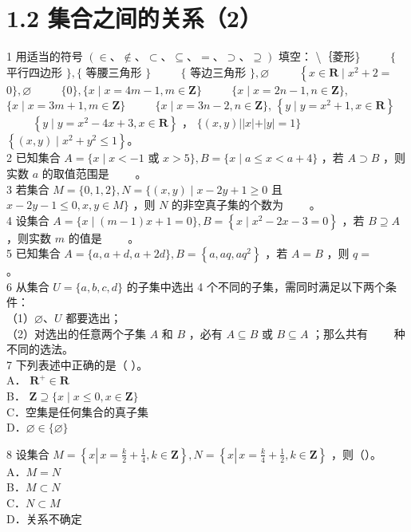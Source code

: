 \documentclass[10pt]{article}
\begin{document}
\section*{1.2 集合之间的关系（2）}
1 用适当的符号 \((\in 、 \notin 、 \subset 、 \subseteq 、=、 \supset 、 \supseteq)\) 填空： \textbackslash ｛菱形\} \(\qquad\) \(\{\) 平行四边形 \(\},\{\) 等腰三角形 \(\}\) \(\qquad\) \(\{\) 等边三角形 \(\}, \varnothing\) \(\qquad\) \(\left\{x \in \mathbf{R} \mid x^{2}+2=\right.\) \(0\}, \varnothing\) \(\qquad\) \(\{0\},\{x \mid x=4 m-1, m \in \mathbf{Z}\}\) \(\qquad\) \(\{x \mid x=2 n-1, n \in \mathbf{Z}\}\), \(\{x \mid x=3 m+1, m \in \mathbf{Z}\}\) \(\qquad\) \(\{x \mid x=3 n-2, n \in \mathbf{Z}\}\), \(\left\{y \mid y=x^{2}+1, x \in \mathbf{R}\right\}\) \(\qquad\) \(\left\{y \mid y=x^{2}-4 x+3, x \in \mathbf{R}\right\}\) ， \(\{(x, y)||x|+|y|=1\}\) \(\qquad\) \(\left\{(x, y) \mid x^{2}+y^{2} \leqslant 1\right\} 。\)\\
2 已知集合 \(A=\{x \mid x<-1\) 或 \(x>5\}, B=\{x \mid a \leqslant x<a+4\}\) ，若 \(A \supset B\) ，则实数 \(a\) 的取值范围是 \(\qquad\)。\\
3 若集合 \(M=\{0,1,2\}, N=\{(x, y) \mid x-2 y+1 \geqslant 0\) 且 \(x-2 y-1 \leqslant 0, x, y \in M\}\) ，则 \(N\) 的非空真子集的个数为 \(\qquad\)。\\
4 设集合 \(A=\{x \mid(m-1) x+1=0\}, B=\left\{x \mid x^{2}-2 x-3=0\right\}\) ，若 \(B \supseteq A\) ，则实数 \(m\) 的值是 \(\qquad\)。\\
5 已知集合 \(A=\{a, a+d, a+2 d\}, B=\left\{a, a q, a q^{2}\right\}\) ，若 \(A=B\) ，则 \(q=\) \(\qquad\)。\\
6 从集合 \(U=\{a, b, c, d\}\) 的子集中选出 4 个不同的子集，需同时满足以下两个条件：\\
（1）\(\varnothing 、 U\) 都要选出；\\
（2）对选出的任意两个子集 \(A\) 和 \(B\) ，必有 \(A \subseteq B\) 或 \(B \subseteq A\) ；那么共有 \(\qquad\)种不同的选法。\\
7 下列表述中正确的是（ ）。\\
A． \(\mathbf{R}^{+} \in \mathbf{R}\)\\
B． \(\mathbf{Z} \supseteq\{x \mid x \leqslant 0, x \in \mathbf{Z}\}\)\\
C．空集是任何集合的真子集\\
D．\(\varnothing \in\{\varnothing\}\)

8 设集合 \(M=\left\{x \left\lvert\, x=\frac{k}{2}+\frac{1}{4}\right., k \in \mathbf{Z}\right\}, N=\left\{x \left\lvert\, x=\frac{k}{4}+\frac{1}{2}\right., k \in \mathbf{Z}\right\}\) ，则（）。\\
A．\(M=N\)\\
B．\(M \subset N\)\\
C．\(N \subset M\)\\
D．关系不确定
\end{document}
